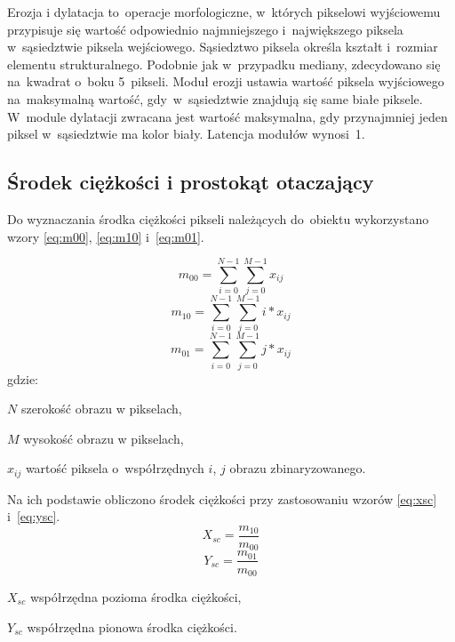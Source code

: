 Erozja i dylatacja to~operacje morfologiczne, w~których pikselowi wyjściowemu przypisuje się wartość odpowiednio najmniejszego i~największego piksela w~sąsiedztwie piksela wejściowego. 
Sąsiedztwo piksela określa kształt i~rozmiar elementu strukturalnego. 
Podobnie jak w~przypadku mediany, zdecydowano się na~kwadrat o~boku 5~pikseli. 
Moduł erozji ustawia wartość piksela wyjściowego na~maksymalną wartość, gdy~w~sąsiedztwie znajdują się same białe piksele. 
W~module dylatacji zwracana jest wartość maksymalna, gdy przynajmniej jeden piksel w~sąsiedztwie ma kolor biały. 
Latencja modułów wynosi~1. %

\subsection{Środek ciężkości i prostokąt otaczający}
\label{subsec:srodek_ciezosci}

Do wyznaczania środka ciężkości pikseli należących do~obiektu wykorzystano wzory \eqref{eq:m00}, \eqref{eq:m10} i~\eqref{eq:m01}.

\begin{equation}
\label{eq:m00}
m_{00}=\sum_{i=0}^{N-1}\sum_{j=0}^{M-1} x_{ij}
\end{equation}
\begin{equation}
\label{eq:m10}
m_{10}=\sum_{i=0}^{N-1}\sum_{j=0}^{M-1} i*x_{ij}
\end{equation}
\begin{equation}
\label{eq:m01}
m_{01}=\sum_{i=0}^{N-1}\sum_{j=0}^{M-1} j*x_{ij}
\end{equation}
gdzie:
\begin{eqwhere}[2cm]
	\item[$N$] szerokość obrazu w pikselach,
	\item[$M$] wysokość obrazu w pikselach,
	\item[$x_{ij}$] wartość piksela o~współrzędnych $i$, $j$ obrazu zbinaryzowanego.
\end{eqwhere}
Na ich podstawie obliczono środek ciężkości przy zastosowaniu wzorów \eqref{eq:xsc} i~\eqref{eq:ysc}.
\begin{equation}
\label{eq:xsc}
X_{sc}=\frac{m_{10}}{m_{00}}
\end{equation}
\begin{equation}
\label{eq:ysc}
Y_{sc}=\frac{m_{01}}{m_{00}}
\end{equation}
\begin{eqwhere}[2cm]
	\item[$X_{sc}$] współrzędna pozioma środka ciężkości,
	\item[$Y_{sc}$] współrzędna pionowa środka ciężkości.
\end{eqwhere}

